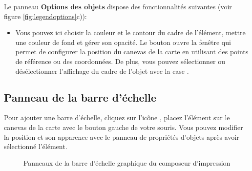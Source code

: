 
Le panneau \textbf{Options des objets} dispose des fonctionnalités suivantes (voir figure \ref{fig:legendoptions}c)):

\begin{itemize}[label=--]
\item Vous pouvez ici choisir la couleur et le contour du cadre de l'élément, mettre une couleur de fond et gérer son opacité. Le bouton  ouvre la fenêtre  qui permet de configurer la position du canevas de la carte en utilisant des points de référence ou des coordonnées. De plus, vous pouvez sélectionner ou désélectionner l'affichage du cadre de l'objet avec la case .
\end{itemize}

\subsection{Panneau de la barre d'échelle}

Pour ajouter une barre d'échelle, cliquez sur l'icône , placez l'élément sur le canevas de la carte avec le bouton gauche de votre souris. Vous pouvez modifier la position et son apparence avec le panneau de propriétés d'objets après avoir sélectionné l'élément.

\begin{figure}[ht]
\centering
{}
\hspace{1cm}
\caption{Panneaux de la barre d'échelle graphique du composeur d'impression \nixcaption}\label{fig:scalebaroptions}
\end{figure}

